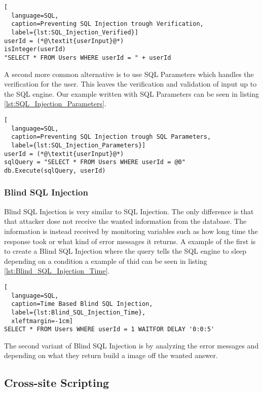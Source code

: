 \hfill
\begin{lstlisting}[
  language=SQL,
  caption=Preventing SQL Injection trough Verification,
  label={lst:SQL_Injection_Verified}]
userId = (*@\textit{userInput}@*)
isInteger(userId)
"SELECT * FROM Users WHERE userId = " + userId
\end{lstlisting}
\hfill

A second more common alternative is to use SQL Parameters which handles the verification for the user. This leaves the verification and validation of input up to the SQL engine. Our example written with SQL Parameters can be seen in listing \ref{lst:SQL_Injection_Parameters}.

\hfill
\begin{lstlisting}[
  language=SQL,
  caption=Preventing SQL Injection trough SQL Parameters,
  label={lst:SQL_Injection_Parameters}]
userId = (*@\textit{userInput}@*)
sqlQuery = "SELECT * FROM Users WHERE userId = @0"
db.Execute(sqlQuery, userId)
\end{lstlisting}
\hfill


\subsubsection{Blind SQL Injection}
Blind SQL Injection is very similar to SQL Injection. The only difference is that that attacker dose not receive the wanted information from the database. The information is instead received by monitoring variables such as how long time the response took or what kind of error messages it returns. A example of the first is to create a Blind SQL Injection where the query tells the SQL engine to sleep depending on a condition a example of thid can be seen in listing \ref{lst:Blind_SQL_Injection_Time}. \parencite{JustinClarke-Salt2009SIAa, Secure_Web} 

\hfill
\begin{lstlisting}[
  language=SQL,
  caption=Time Based Blind SQL Injection,
  label={lst:Blind_SQL_Injection_Time},
  xleftmargin=-1cm]
SELECT * FROM Users WHERE userId = 1 WAITFOR DELAY '0:0:5'
\end{lstlisting}
\hfill

The second variant of Blind SQL Injection is by analyzing the error messages and depending on what they return build a image off the wanted answer. \parencite{JustinClarke-Salt2009SIAa, Secure_Web} 

\subsection{Cross-site Scripting}


